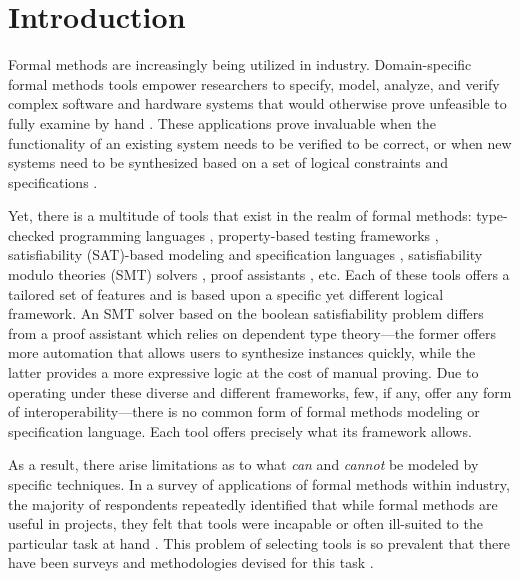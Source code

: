 
\section{Introduction}
Formal methods are increasingly being utilized in industry. Domain-specific formal methods tools empower researchers to specify, model, analyze, and verify complex software and hardware systems that would otherwise prove unfeasible to fully examine by hand \cite{abrial2006formal,lecomte2017applying}. These applications prove invaluable when the functionality of an existing system needs to be verified to be correct, or when new systems need to be synthesized based on a set of logical constraints and specifications \cite{woodcock2009formal}.

Yet, there is a multitude of tools that exist in the realm of formal methods: type-checked programming languages \cite{gao2017type,chaudhuri2017fast}, property-based testing frameworks \cite{fink1997property,maciver2019hypothesis}, satisfiability (SAT)-based modeling and specification languages \cite{jackson2012software,jackson2019alloy,ngpdbccdlrrvwwk-oopsla-2024}, satisfiability modulo theories (SMT) solvers \cite{de2008z3}, proof assistants \cite{moura2021lean}, etc. Each of these tools offers a tailored set of features and is based upon a specific yet different logical framework. An SMT solver based on the boolean satisfiability problem differs from a proof assistant which relies on dependent type theory---the former offers more automation that allows users to synthesize instances quickly, while the latter provides a more expressive logic at the cost of manual proving. Due to operating under these diverse and different frameworks, few, if any, offer any form of interoperability---there is no common form of formal methods modeling or specification language. Each tool offers precisely what its framework allows. 

As a result, there arise limitations as to what \emph{can} and \emph{cannot} be modeled by specific techniques. In a survey of applications of formal methods within industry, the majority of respondents repeatedly identified that while formal methods are useful in projects, they felt that tools were incapable or often ill-suited to the particular task at hand \cite{woodcock2009formal}. This problem of selecting tools is so prevalent that there have been surveys and methodologies devised for this task \cite{kossak2016select,cheng2006survey}. 

